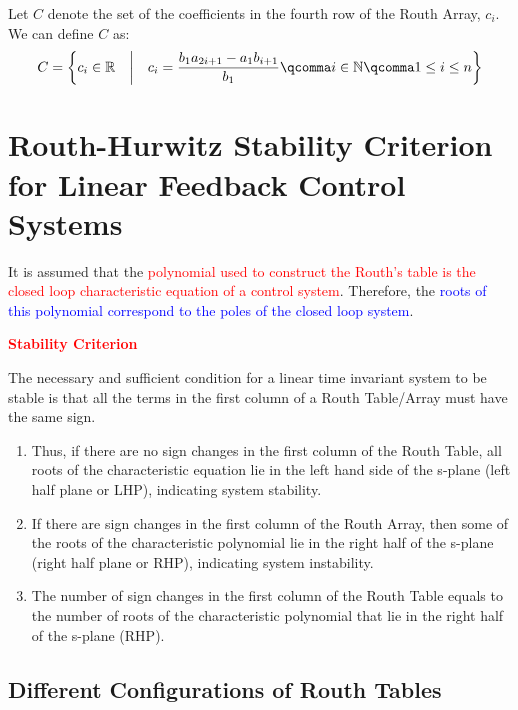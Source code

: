 \documentclass[
  14pt,
  a4paper,
  oneside,
  open=any,
  a4paper,
  14pt]{report}
\begin{document}
\begin{definition}
Let $C$ denote the set of the coefficients in the fourth row of the Routh Array, $c_i$.
We can define $C$ as:
$$
    C = \left\{ c_i \in \mathbb{R} \quad \middle| \quad c_i = \dfrac{b_1 a_{2i+1} - a_1 b_{i+1}}{b_1}\qcomma i\in \mathbb{N}\qcomma 1 \leq i \leq n \right\}
$$
\end{definition}

\section{Routh-Hurwitz Stability Criterion for Linear Feedback Control
Systems}\label{routh-hurwitz-stability-criterion-for-linear-feedback-control-systems}

It is assumed that the \textcolor{red}{polynomial used to construct the
Routh's table is the closed loop characteristic equation of a control
system}. Therefore, the \textcolor{blue}{roots of this polynomial
correspond to the poles of the closed loop system}.

\textcolor{red}{\textbf{Stability Criterion}}

The necessary and sufficient condition for a linear time invariant
system to be stable is that all the terms in the first column of a Routh
Table/Array must have the same sign.

\begin{enumerate}
\def\labelenumi{\roman{enumi}.}
\item
  Thus, if there are no sign changes in the first column of the Routh
  Table, all roots of the characteristic equation lie in the left hand
  side of the s-plane (left half plane or LHP), indicating system
  stability.
\item
  If there are sign changes in the first column of the Routh Array, then
  some of the roots of the characteristic polynomial lie in the right
  half of the s-plane (right half plane or RHP), indicating system
  instability.
\item
  The number of sign changes in the first column of the Routh Table
  equals to the number of roots of the characteristic polynomial that
  lie in the right half of the s-plane (RHP).
\end{enumerate}

\subsection{Different Configurations of Routh
Tables}\label{different-configurations-of-routh-tables}
\end{document}
